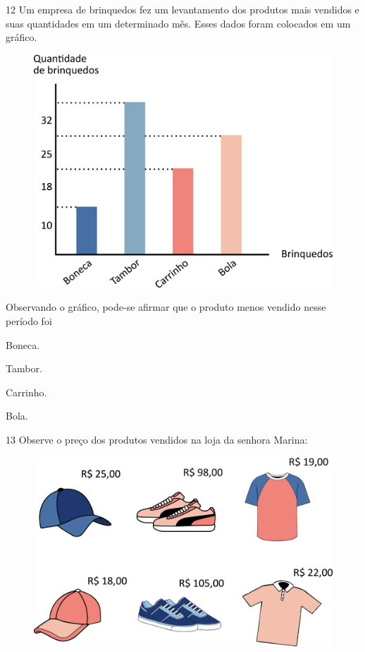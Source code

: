 \pagebreak
\num{12} Um empresa de brinquedos fez um levantamento dos produtos mais vendidos e suas quantidades em um determinado mês. Esses dados foram colocados em um gráfico.


\begin{figure}[htpb!]
\centering
\includegraphics[width=\textwidth]{./media/image119.png}
\end{figure}

Observando o gráfico, pode-se afirmar que o produto menos vendido nesse período foi

\begin{escolha}
\item
  Boneca.
\item
  Tambor.
\item
  Carrinho.
\item
  Bola.
\end{escolha}

\pagebreak
\num{13} Observe o preço dos produtos vendidos na loja da senhora Marina:

\begin{figure}[htpb!]
\centering
\includegraphics[width=.7\textwidth]{./media/image120.png}
\end{figure}

